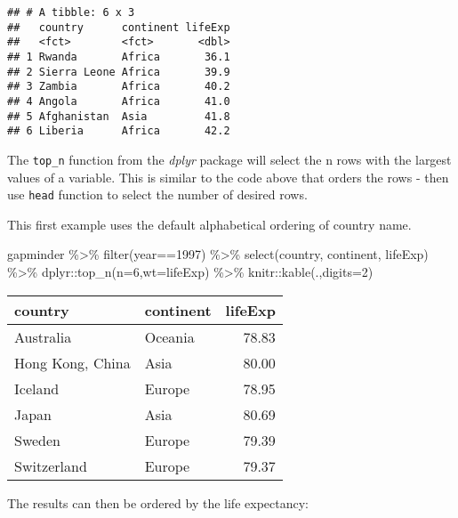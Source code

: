 \documentclass[
]{book}
\newenvironment{Shaded}{\begin{snugshade}}{\end{snugshade}}
\newcommand{\AttributeTok}[1]{\textcolor[rgb]{0.77,0.63,0.00}{#1}}
\newcommand{\DecValTok}[1]{\textcolor[rgb]{0.00,0.00,0.81}{#1}}
\newcommand{\FunctionTok}[1]{\textcolor[rgb]{0.00,0.00,0.00}{#1}}
\newcommand{\NormalTok}[1]{#1}
\newcommand{\SpecialCharTok}[1]{\textcolor[rgb]{0.00,0.00,0.00}{#1}}
\begin{document}
\begin{verbatim}
## # A tibble: 6 x 3
##   country      continent lifeExp
##   <fct>        <fct>       <dbl>
## 1 Rwanda       Africa       36.1
## 2 Sierra Leone Africa       39.9
## 3 Zambia       Africa       40.2
## 4 Angola       Africa       41.0
## 5 Afghanistan  Asia         41.8
## 6 Liberia      Africa       42.2
\end{verbatim}

The \texttt{top\_n} function from the \emph{dplyr} package will select the n rows with the largest values of a variable. This is similar to the code above that orders the rows - then use \texttt{head} function to select the number of desired rows.

This first example uses the default alphabetical ordering of country name.

\begin{Shaded}
\begin{Highlighting}[]
\NormalTok{gapminder }\SpecialCharTok{\%\textgreater{}\%} 
  \FunctionTok{filter}\NormalTok{(year}\SpecialCharTok{==}\DecValTok{1997}\NormalTok{) }\SpecialCharTok{\%\textgreater{}\%}  
  \FunctionTok{select}\NormalTok{(country, continent, lifeExp) }\SpecialCharTok{\%\textgreater{}\%}
\NormalTok{  dplyr}\SpecialCharTok{::}\FunctionTok{top\_n}\NormalTok{(}\AttributeTok{n=}\DecValTok{6}\NormalTok{,}\AttributeTok{wt=}\NormalTok{lifeExp) }\SpecialCharTok{\%\textgreater{}\%}
\NormalTok{  knitr}\SpecialCharTok{::}\FunctionTok{kable}\NormalTok{(.,}\AttributeTok{digits=}\DecValTok{2}\NormalTok{)}
\end{Highlighting}
\end{Shaded}

\begin{tabular}{l|l|r}
\hline
country & continent & lifeExp\\
\hline
Australia & Oceania & 78.83\\
\hline
Hong Kong, China & Asia & 80.00\\
\hline
Iceland & Europe & 78.95\\
\hline
Japan & Asia & 80.69\\
\hline
Sweden & Europe & 79.39\\
\hline
Switzerland & Europe & 79.37\\
\hline
\end{tabular}

The results can then be ordered by the life expectancy:
\end{document}
